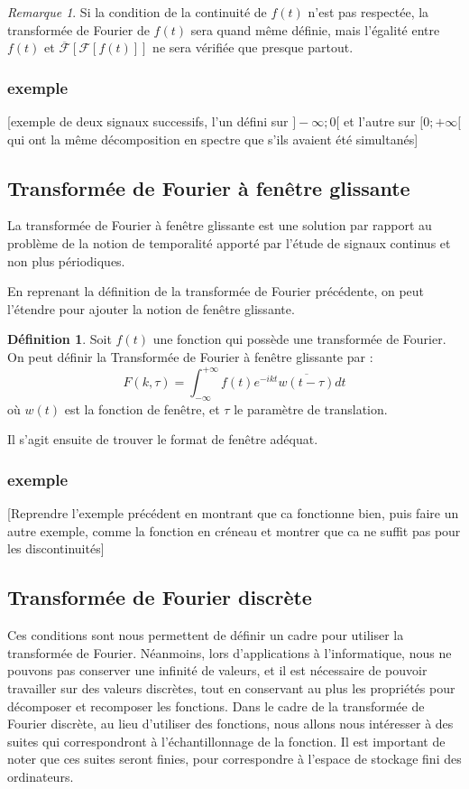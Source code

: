 \documentclass[]{article}
\theoremstyle{remark}
\newtheorem{myrem}{Remarque}
\theoremstyle{definition}
\newtheorem{mydef}{Définition}
\begin{document}
			\begin{myrem}
				Si la condition de la continuité de $f(t)$ n'est pas respectée, la transformée de Fourier de $f(t)$ sera quand même définie, mais l'égalité entre $f(t)$ et $\overline{\mathcal{F}}[\mathcal{F}[f(t)]]$ ne sera vérifiée que presque partout. 
			\end{myrem}
		
			
	\subsubsection{exemple}
	[exemple de deux signaux successifs, l'un défini sur $ ] -\infty; 0[$ et l'autre sur $ [0; +\infty[$ qui ont la même décomposition en spectre que s'ils avaient été simultanés]
	
	\subsection{Transformée de Fourier à fenêtre glissante}
	La transformée de Fourier à fenêtre glissante est une solution par rapport au problème de la notion de temporalité apporté par l'étude de signaux continus et non plus périodiques. 

	En reprenant la définition de la transformée de Fourier précédente, on peut l'étendre pour ajouter la notion de fenêtre glissante. 
		
	\begin{mydef}
		Soit $f(t)$ une fonction qui possède une transformée de Fourier. On peut définir la Transformée de Fourier à fenêtre glissante par :
		$$ F(k, \tau)= \int_{-\infty}^{+\infty}f(t)e^{-ikt} \overline{w(t - \tau)}dt$$
		où $w(t)$ est la fonction de fenêtre, et $\tau$ le paramètre de translation. 
	\end{mydef}
	Il s'agit ensuite de trouver le format de fenêtre adéquat. 
	
	\subsubsection{exemple}
	[Reprendre l'exemple précédent en montrant que ca fonctionne bien, puis faire un autre exemple, comme la fonction en créneau et montrer que ca ne suffit pas pour les discontinuités]
	
	
	\subsection{Transformée de Fourier discrète}
			
	Ces conditions sont nous permettent de définir un cadre pour utiliser la transformée de Fourier. Néanmoins, lors d'applications à l'informatique, nous ne pouvons pas conserver une infinité de valeurs, et il est nécessaire de pouvoir travailler sur des valeurs discrètes, tout en conservant au plus les propriétés pour décomposer et recomposer les fonctions. 		
	Dans le cadre de la transformée de Fourier discrète, au lieu d'utiliser des fonctions, nous allons nous intéresser à des suites qui correspondront à l'échantillonnage de la fonction. Il est important de noter que ces suites seront finies, pour correspondre à l'espace de stockage fini des ordinateurs. 
	
\end{document}
